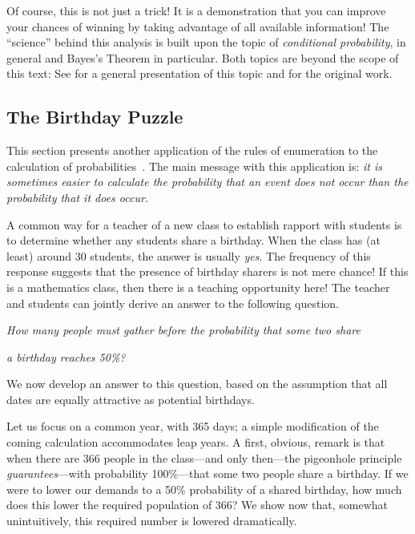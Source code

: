 Of course, this is not just a trick!  It is a demonstration that you
can improve your chances of winning by taking advantage of all
available information!  The ``science'' behind this analysis is built
upon the topic of {\em conditional probability},
 in general and Bayes's Theorem in
particular.   Both topics are beyond the scope
of this text: See \cite{Lee12} for a general presentation of this
topic and \cite{Bayes} for the original work.


\subsection{The Birthday Puzzle}
\label{sec:birthday-puzzle}

This section presents another application of the rules of enumeration
to the calculation of probabilities~\cite{DumasTrystram}.  The main
message with this application is: {\em it is sometimes easier to
  calculate the probability that an event {\em does not} occur than
  the probability that it {\em does} occur.}

\medskip

A common way for a teacher of a new class to establish rapport with
students is to determine whether any students share a birthday.  When
the class has (at least) around 30 students, the answer is usually
\textit{yes}.  The frequency of this response suggests that the
presence of birthday sharers is not mere chance!  If this is a
mathematics class, then there is a teaching opportunity here!  The
teacher and students can jointly derive an answer to the following
question.

{\it How many people must gather before the probability that some two share}

{\it a birthday reaches 50\%?}

\smallskip

\noindent
We now develop an answer to this question, based on the assumption
that all dates are equally attractive as potential birthdays.

\bigskip

Let us focus on a common year, with 365 days; a simple modification of
the coming calculation accommodates leap years.  A first, obvious,
remark is that when there are 366 people in the class---and only
then---the pigeonhole principle {\em guarantees}---with probability
100\%---that some two people share a birthday.  If we were to lower
our demands to a 50\% probability of a shared birthday, how much does
this lower the required population of 366?  We show now that, somewhat
unintuitively, this required number is lowered dramatically.

